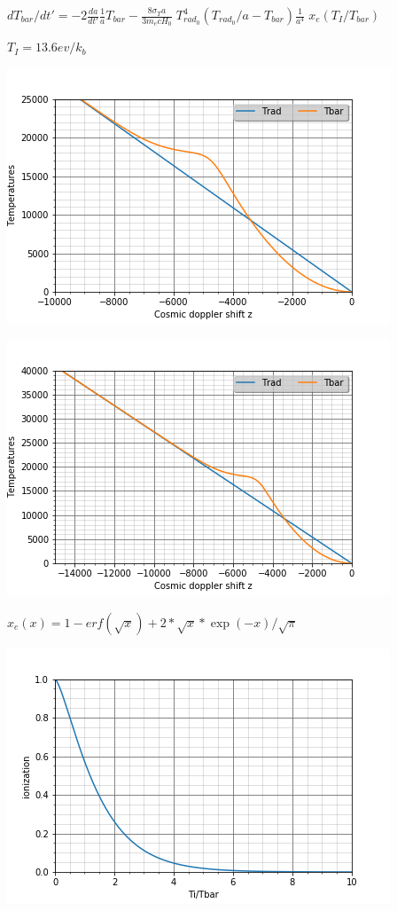 \documentclass[12pt, a4paper]{article}
\begin{document}
\newpage
\bigskip

$dT_{bar}/dt' = -2 \frac{da}{dt'}\frac{1}{a} T_{bar}-\frac{8\sigma_Ta}{3m_ecH_0}\; T_{rad_0}^4 (T_{rad_0}/a-T_{bar})\frac{1}{a^4} \; x_e(T_I/T_{bar})$

\medskip

$T_I = 13.6ev/k_b$


\includegraphics{Temperatures}

\newpage
\includegraphics{TemperaturesL}

\newpage

$x_e(x)=1-erf(\sqrt{x})+2*\sqrt{x}*\exp(-x)/\sqrt{\pi}$


\includegraphics{XE}
\end{document}
